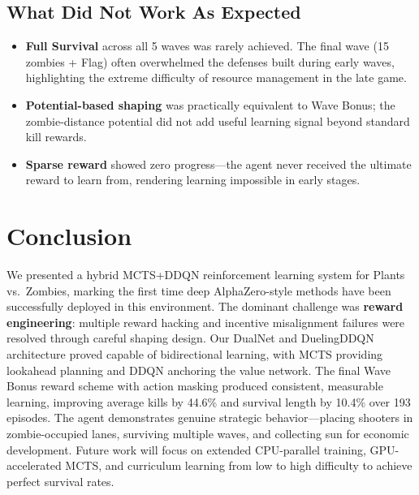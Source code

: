 \subsection{What Did Not Work As Expected}
\begin{itemize}[leftmargin=*,nosep]
    \item \textbf{Full Survival} across all 5 waves was rarely achieved. The final wave (15 zombies + Flag) often overwhelmed the defenses built during early waves, highlighting the extreme difficulty of resource management in the late game.
    \item \textbf{Potential-based shaping} was practically equivalent to Wave Bonus; the zombie-distance potential did not add useful learning signal beyond standard kill rewards.
    \item \textbf{Sparse reward} showed zero progress---the agent never received the ultimate reward to learn from, rendering learning impossible in early stages.
\end{itemize}

\section{Conclusion}

We presented a hybrid MCTS+DDQN reinforcement learning system for Plants vs.\ Zombies, marking the first time deep AlphaZero-style methods have been successfully deployed in this environment. The dominant challenge was \textbf{reward engineering}: multiple reward hacking and incentive misalignment failures were resolved through careful shaping design. Our DualNet and DuelingDDQN architecture proved capable of bidirectional learning, with MCTS providing lookahead planning and DDQN anchoring the value network. The final Wave Bonus reward scheme with action masking produced consistent, measurable learning, improving average kills by 44.6\% and survival length by 10.4\% over 193 episodes. The agent demonstrates genuine strategic behavior---placing shooters in zombie-occupied lanes, surviving multiple waves, and collecting sun for economic development. Future work will focus on extended CPU-parallel training, GPU-accelerated MCTS, and curriculum learning from low to high difficulty to achieve perfect survival rates.

